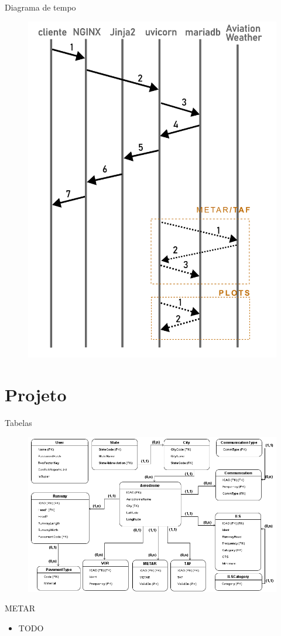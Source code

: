 \documentclass{beamer}
\begin{document}
\begin{frame}{Diagrama de tempo}
    \begin{figure}[ht]
        \begin{center}
        \includegraphics[width=0.4\linewidth]{img/diagrama-tempo.png}
        \label{fig:arquitetura}
        \end{center}
    \end{figure}
\end{frame}


\section{Projeto}

\begin{frame}{Tabelas}
    \begin{figure}[ht]
        \begin{center}
        \includegraphics[width=0.8\linewidth]{img/ERAero.png}
        \label{fig:arquitetura}
        \end{center}
    \end{figure}
\end{frame}

\begin{frame}{METAR}
    \begin{itemize}
        \item TODO
    \end{itemize}
\end{frame}
\end{document}
